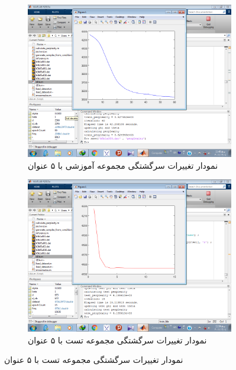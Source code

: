 \documentclass[11.5pt,a4paper]{article}
\begin{document}
\begin{figure}[h]
	\begin{subfigure}{.45\textwidth}
		\includegraphics[scale=0.25]{Imgs/k5_b1_a003_25s_ptr3524945.png}
		\caption{نمودار تغییرات سرگشتگی مجموعه‌ آموزشی با ۵ عنوان}
	\end{subfigure}
	\begin{subfigure}{.45\textwidth}
		\includegraphics[scale=0.25]{Imgs/k5_b1_a003_8s_pts4155610.png}
		\caption{نمودار تغییرات سرگشتگی مجموعه‌ تست با ۵ عنوان}
	\end{subfigure}


\end{figure}
\end{document}
